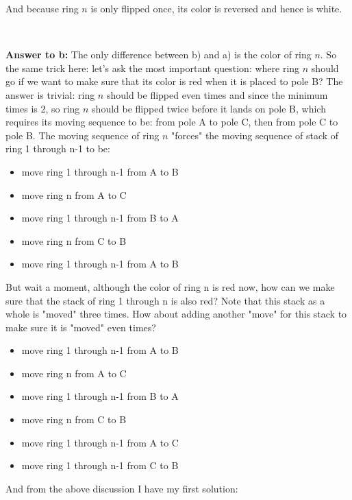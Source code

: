 \documentclass[a4paper,11pt]{article}
\theoremstyle{mytheor}
\begin{document}
\noindent And because ring $n$ is only flipped once, its color is reversed and hence is white.

~\\
\vspace{1.2in}


\textbf{Answer to b:} The only difference between b) and a) is the color of ring $n$. So the same trick here: let's ask the most important question: where ring $n$ should go if we want to make sure that its color is red when it is placed to pole B? The answer is trivial: ring $n$ should be flipped even times and since the minimum times is 2, so ring $n$ should be flipped twice before it lands on pole B, which requires its moving sequence to be: from pole A to pole C, then from pole C to pole B. The moving sequence of ring $n$ "forces" the moving sequence of stack of ring 1 through n-1 to be:
\begin{itemize}
    \item move ring 1 through n-1 from A to B
    \item move ring n from A to C
    \item move ring 1 through n-1 from B to A
    \item move ring n from C to B
    \item move ring 1 through n-1 from A to B
\end{itemize}
But wait a moment, although the color of ring n is red now, how can we make sure that the stack of ring 1 through n is also red? Note that this stack as a whole is "moved" three times. How about adding another "move" for this stack to make sure it is "moved" even times?
\begin{itemize}
    \item move ring 1 through n-1 from A to B
    \item move ring n from A to C
    \item move ring 1 through n-1 from B to A
    \item move ring n from C to B
    \item move ring 1 through n-1 from A to C
    \item move ring 1 through n-1 from C to B
\end{itemize}
And from the above discussion I have my first solution:
\iffalse
\begin{lstlisting}[label={list:seventh0},caption=Red Tower of Hanoi procedure.]
procedure RTH(n, A, B, C);
  if n == 1:
    move ring 1 from A to C;
    move ring 1 from C to B;
  else:
    RTH(n-1, A, B, C);
    move ring n from A to C;
    RTH(n-1, B, A, C);
    move ring n from C to B;
    RTH(n-1, A, C, B);
    RTH(n-1, C, B, A);
  end if
\end{lstlisting}
\fi
\end{document}
